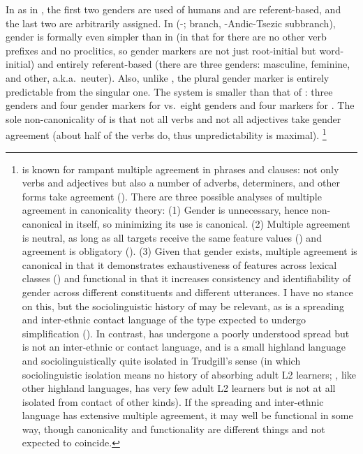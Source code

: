 \documentclass[output=collectionpaper]{langsci/langscibook}
\begin{document}
In  as in , the first two genders are used of humans and are referent-based, and the last two are arbitrarily assigned. In  (\hyp{};  branch, -Andic-Tsezic subbranch), gender is formally even simpler than in  (in that for  there are no other verb prefixes and no proclitics, so gender markers are not just root-initial but word-initial) and entirely referent-based (there are three genders: masculine, feminine, and other, a.k.a.\ neuter). Also, unlike , the plural gender marker is entirely predictable from the singular one. The system is smaller than that of : three genders and four gender markers for  vs.\ eight genders and four markers for . The sole non-canonicality of  is that not all verbs and not all adjectives take gender agreement (about half of the verbs do, thus unpredictability is maximal).%
\footnote{%
\label{fn:Nich:8}%
 is known for rampant multiple agreement in phrases and clauses: not only verbs and adjectives but also a number of adverbs, determiners, and other forms take agreement (\citealt{Kibrik1985,Kibrik2003}). There are three possible analyses of multiple agreement in canonicality theory: (1) Gender is unnecessary, hence non-canonical in itself, so minimizing its use is canonical. (2) Multiple agreement is neutral, as long as all targets receive the same feature values (\citealt[513]{Corbett2016}) and agreement is obligatory (\citealt[14--15]{Corbett2006}). (3) Given that gender exists, multiple agreement is canonical in that it demonstrates exhaustiveness of features across lexical classes (\citealt[54]{Corbett2013c}) and functional in that it increases consistency and identifiability of gender across different constituents and different utterances. I have no stance on this, but the sociolinguistic history of  may be relevant, as  is a spreading and inter-ethnic contact language of the type expected to undergo simplification (\citealt{Trudgill2011}).  In contrast,  has undergone a poorly understood spread but is not an inter-ethnic or contact language, and  is a small highland language and sociolinguistically quite isolated in Trudgill's sense (in which sociolinguistic isolation means no history of absorbing adult L2 learners; , like other highland  languages, has very few adult L2 learners but is not at all isolated from contact of other kinds). If the spreading and inter-ethnic language has extensive multiple agreement, it may well be functional in some way, though canonicality and functionality are different things and not expected to coincide.
}%
\end{document}
